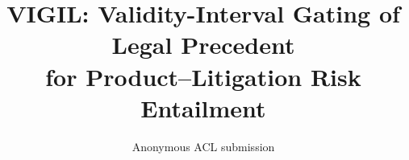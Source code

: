 \title{VIGIL: Validity-Interval Gating of Legal Precedent\\for Product--Litigation Risk Entailment}
\author{Anonymous ACL submission}
